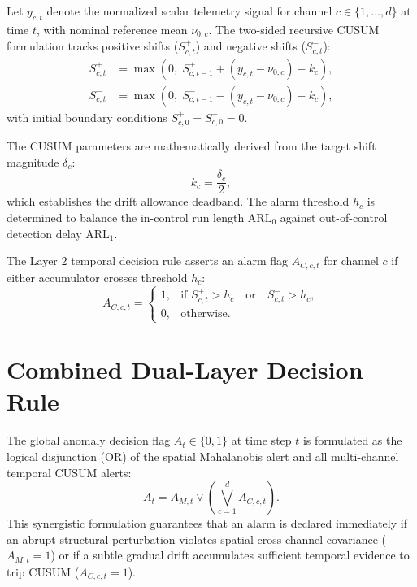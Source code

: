 \documentclass[11pt,a4paper]{report}
\begin{document}
Let $y_{c,t}$ denote the normalized scalar telemetry signal for channel $c \in \{1, \dots, d\}$
at time $t$, with nominal reference mean $\nu_{0,c}$. The two-sided recursive CUSUM
formulation tracks positive shifts ($S_{c,t}^+$) and negative shifts ($S_{c,t}^-$):
\begin{align}
S_{c,t}^+ &= \max\left(0, \; S_{c,t-1}^+ + (y_{c,t} - \nu_{0,c}) - k_c\right), \label{eq:ch3_cusum_pos} \\
S_{c,t}^- &= \max\left(0, \; S_{c,t-1}^- - (y_{c,t} - \nu_{0,c}) - k_c\right), \label{eq:ch3_cusum_neg}
\end{align}
with initial boundary conditions $S_{c,0}^+ = S_{c,0}^- = 0$.

The CUSUM parameters are mathematically derived from the target shift magnitude $\delta_c$:
\begin{equation}
k_c = \frac{\delta_c}{2},
\end{equation}
which establishes the drift allowance deadband. The alarm threshold $h_c$ is determined
to balance the in-control run length $\text{ARL}_0$ against out-of-control detection delay $\text{ARL}_1$.

The Layer 2 temporal decision rule asserts an alarm flag $A_{C,c,t}$ for channel $c$ if
either accumulator crosses threshold $h_c$:
\begin{equation}
A_{C,c,t} = \begin{cases}
1, & \text{if } S_{c,t}^+ > h_c \quad \text{or} \quad S_{c,t}^- > h_c, \\
0, & \text{otherwise}.
\end{cases}
\label{eq:ch3_layer2_decision}
\end{equation}

\section{Combined Dual-Layer Decision Rule}
The global anomaly decision flag $A_t \in \{0, 1\}$ at time step $t$ is formulated as the
logical disjunction (OR) of the spatial Mahalanobis alert and all multi-channel temporal
CUSUM alerts:
\begin{equation}
A_t = A_{M,t} \lor \left( \bigvee_{c=1}^d A_{C,c,t} \right).
\label{eq:ch3_global_decision}
\end{equation}
This synergistic formulation guarantees that an alarm is declared immediately if an abrupt
structural perturbation violates spatial cross-channel covariance ($A_{M,t} = 1$) or if a
subtle gradual drift accumulates sufficient temporal evidence to trip CUSUM ($A_{C,c,t} = 1$).
\end{document}
